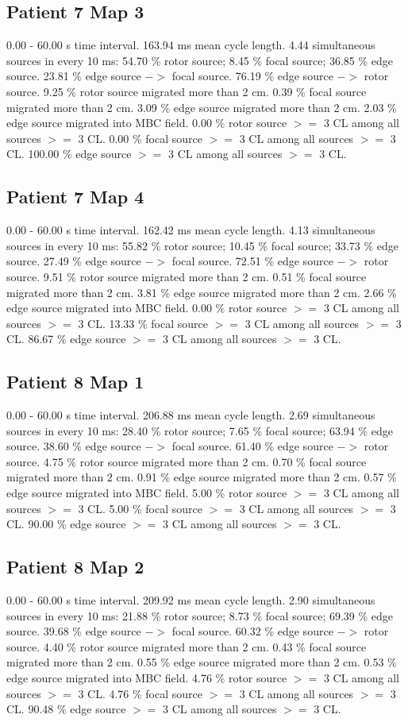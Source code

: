 \documentclass[journal,onecolumn]{IEEEtran} %
\begin{document}
\subsection{Patient 7 Map 3}
0.00 - 60.00 s time interval.
163.94 ms mean cycle length.
4.44 simultaneous sources in every 10 ms:
54.70 \% rotor source;
8.45 \% focal source;
36.85 \% edge source.
23.81 \% edge source $->$ focal source.
76.19 \% edge source $->$ rotor source.
9.25 \% rotor source migrated more than 2 cm.
0.39 \% focal source migrated more than 2 cm.
3.09 \% edge source migrated more than 2 cm.
2.03 \% edge source migrated into MBC field.
0.00 \% rotor source $>=$ 3 CL among all sources $>=$ 3 CL.
0.00 \% focal source $>=$ 3 CL among all sources $>=$ 3 CL.
100.00 \% edge source $>=$ 3 CL among all sources $>=$ 3 CL.

\subsection{Patient 7 Map 4}
0.00 - 60.00 s time interval.
162.42 ms mean cycle length.
4.13 simultaneous sources in every 10 ms:
55.82 \% rotor source;
10.45 \% focal source;
33.73 \% edge source.
27.49 \% edge source $->$ focal source.
72.51 \% edge source $->$ rotor source.
9.51 \% rotor source migrated more than 2 cm.
0.51 \% focal source migrated more than 2 cm.
3.81 \% edge source migrated more than 2 cm.
2.66 \% edge source migrated into MBC field.
0.00 \% rotor source $>=$ 3 CL among all sources $>=$ 3 CL.
13.33 \% focal source $>=$ 3 CL among all sources $>=$ 3 CL.
86.67 \% edge source $>=$ 3 CL among all sources $>=$ 3 CL.

\subsection{Patient 8 Map 1}
0.00 - 60.00 s time interval.
206.88 ms mean cycle length.
2.69 simultaneous sources in every 10 ms:
28.40 \% rotor source;
7.65 \% focal source;
63.94 \% edge source.
38.60 \% edge source $->$ focal source.
61.40 \% edge source $->$ rotor source.
4.75 \% rotor source migrated more than 2 cm.
0.70 \% focal source migrated more than 2 cm.
0.91 \% edge source migrated more than 2 cm.
0.57 \% edge source migrated into MBC field.
5.00 \% rotor source $>=$ 3 CL among all sources $>=$ 3 CL.
5.00 \% focal source $>=$ 3 CL among all sources $>=$ 3 CL.
90.00 \% edge source $>=$ 3 CL among all sources $>=$ 3 CL.

\subsection{Patient 8 Map 2}
0.00 - 60.00 s time interval.
209.92 ms mean cycle length.
2.90 simultaneous sources in every 10 ms:
21.88 \% rotor source;
8.73 \% focal source;
69.39 \% edge source.
39.68 \% edge source $->$ focal source.
60.32 \% edge source $->$ rotor source.
4.40 \% rotor source migrated more than 2 cm.
0.43 \% focal source migrated more than 2 cm.
0.55 \% edge source migrated more than 2 cm.
0.53 \% edge source migrated into MBC field.
4.76 \% rotor source $>=$ 3 CL among all sources $>=$ 3 CL.
4.76 \% focal source $>=$ 3 CL among all sources $>=$ 3 CL.
90.48 \% edge source $>=$ 3 CL among all sources $>=$ 3 CL.
\end{document}
